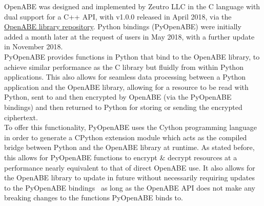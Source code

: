 OpenABE was designed and implemented by Zeutro LLC in the C language with dual support for a C++ API, with v1.0.0 released in April 2018, via the \href{https://github.com/zeutro/openabe/releases}{OpenABE library repository}. Python bindings (PyOpenABE) were initially added a month later at the request of users in May 2018, with a further update in November 2018.\\
PyOpenABE provides functions in Python that bind to the OpenABE library, to achieve similar performance as the C library but fluidly from within Python applications. This also allows for seamless data processing between a Python application and the OpenABE library, allowing for a resource to be read with Python, sent to and then encrypted by OpenABE (via the PyOpenABE bindings) and then returned to Python for storing or sending the encrypted ciphertext.\\
To offer this functionality, PyOpenABE uses the Cython programming language in order to generate a CPython extension module which acts as the compiled bridge between Python and the OpenABE library at runtime. As stated before, this allows for PyOpenABE functions to encrypt \& decrypt resources at a performance nearly equivalent to that of direct OpenABE use. It also allows for the OpenABE library to update in future without necessarily requiring updates to the PyOpenABE bindings \textemdash\ as long as the OpenABE API does not make any breaking changes to the functions PyOpenABE binds to.
